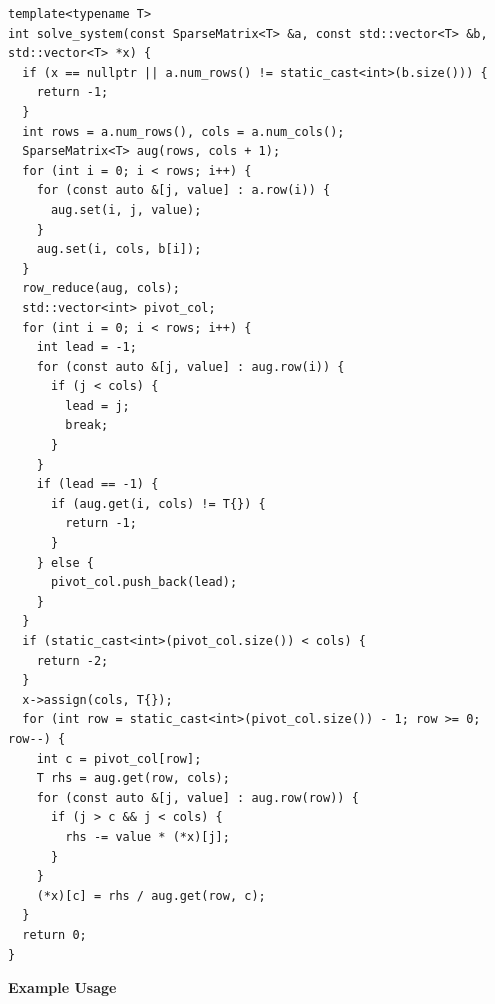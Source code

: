 \begin{lstlisting}[style=cpp]
template<typename T>
int solve_system(const SparseMatrix<T> &a, const std::vector<T> &b, std::vector<T> *x) {
  if (x == nullptr || a.num_rows() != static_cast<int>(b.size())) {
    return -1;
  }
  int rows = a.num_rows(), cols = a.num_cols();
  SparseMatrix<T> aug(rows, cols + 1);
  for (int i = 0; i < rows; i++) {
    for (const auto &[j, value] : a.row(i)) {
      aug.set(i, j, value);
    }
    aug.set(i, cols, b[i]);
  }
  row_reduce(aug, cols);
  std::vector<int> pivot_col;
  for (int i = 0; i < rows; i++) {
    int lead = -1;
    for (const auto &[j, value] : aug.row(i)) {
      if (j < cols) {
        lead = j;
        break;
      }
    }
    if (lead == -1) {
      if (aug.get(i, cols) != T{}) {
        return -1;
      }
    } else {
      pivot_col.push_back(lead);
    }
  }
  if (static_cast<int>(pivot_col.size()) < cols) {
    return -2;
  }
  x->assign(cols, T{});
  for (int row = static_cast<int>(pivot_col.size()) - 1; row >= 0; row--) {
    int c = pivot_col[row];
    T rhs = aug.get(row, cols);
    for (const auto &[j, value] : aug.row(row)) {
      if (j > c && j < cols) {
        rhs -= value * (*x)[j];
      }
    }
    (*x)[c] = rhs / aug.get(row, c);
  }
  return 0;
}
\end{lstlisting}
\textbf{Example Usage}\par
